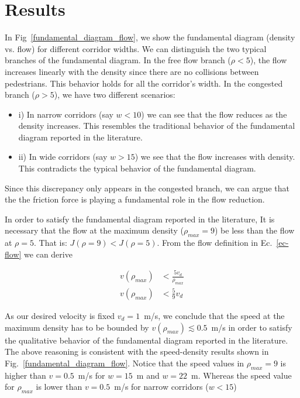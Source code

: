\section{\label{results}Results}

In Fig~\ref{fundamental_diagram_flow}, we show the fundamental diagram (density vs. flow) for different corridor widths. We can distinguish the two typical branches of the fundamental diagram. In the free flow branch ($\rho < 5$), the flow increases linearly with the density since there are no collisions between pedestrians. This behavior holds for all the corridor's width. In the congested branch ($\rho > 5$), we have two different scenarios:


\begin{itemize}
\item i) In narrow corridors (say $w < 10$) we can see that the flow reduces as the density increases. This resembles the traditional behavior of the fundamental diagram reported in the literature. 
\item ii) In wide corridors (say $w > 15$) we see that the flow increases with density. This contradicts the typical behavior of the fundamental diagram.   
\end{itemize}

Since this discrepancy only appears in the congested branch, we can argue that the the friction force is playing a fundamental role in the flow reduction.  

In order to satisfy the fundamental diagram reported in the literature, It is necessary that the flow at the maximum density ($\rho_{max} = 9$) be less than the flow at $\rho = 5$. That is:  $J(\rho = 9) < J(\rho = 5)$. From the flow definition in Ec.~\ref{ec-flow} we can derive

\begin{align*} 
v(\rho_{max}) &< \frac{5v_d}{\rho_{max}} \\
v(\rho_{max}) &< \frac{5}{9} v_d
\end{align*}


As our desired velocity is fixed $v_d = 1$~m/s, we conclude that the speed at the maximum density has to be bounded by $v(\rho_{max}) \lesssim 	0.5$~m/s in order to satisfy the qualitative behavior of the fundamental diagram reported in the literature.\\

The above reasoning is consistent with the speed-density results shown in Fig.~\ref{fundamental_diagram_flow}. Notice that the speed values in $\rho_{max} = 9$ is higher than $v=0.5$~m/s for $w=15$~m and $w=22$~m. Whereas the speed value for $\rho_{max}$ is lower than $v=0.5$~m/s for narrow corridors ($w<15$)\\

